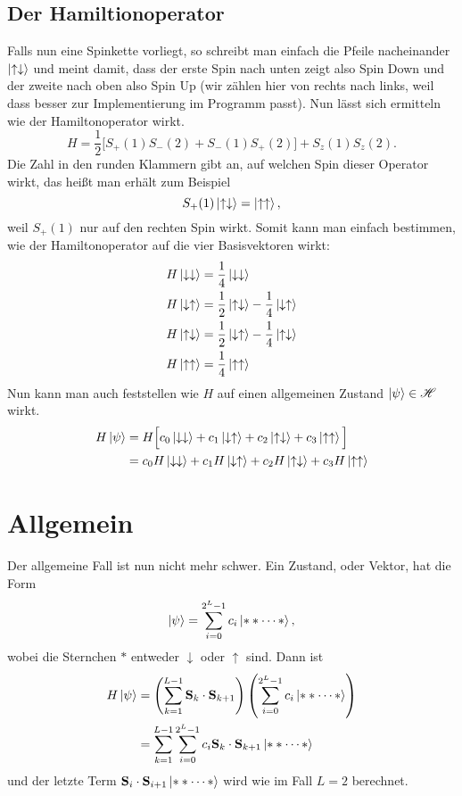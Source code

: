 \documentclass[11pt,a4paper]{scrartcl}
\begin{document}
\subsection{Der Hamiltionoperator}
Falls nun eine Spinkette vorliegt, so schreibt man einfach die Pfeile nacheinander $\ket{\uparrow\downarrow}$ und meint damit, dass der erste Spin nach unten zeigt also Spin Down und der zweite nach oben also Spin Up (wir zählen hier von rechts nach links, weil dass besser zur Implementierung im Programm passt). Nun lässt sich ermitteln wie der Hamiltonoperator wirkt.
\begin{equation*}
	H=\frac{1}{2}\Big[S_+(1)S_-(2)+S_-(1)S_+(2)\Big]+S_z(1)S_z(2).
\end{equation*}
Die Zahl in den runden Klammern gibt an, auf welchen Spin dieser Operator wirkt, das heißt man erhält zum Beispiel
\begin{equation*}
	S_+(1)\ket{\uparrow\downarrow}=\ket{\uparrow\uparrow},
\end{equation*}
weil $S_+(1)$ nur auf den rechten Spin wirkt. Somit kann man einfach bestimmen, wie der Hamiltonoperator auf die vier Basisvektoren wirkt:
\begin{align*}
	H\ket{\downarrow\downarrow}&=\frac{1}{4}\ket{\downarrow\downarrow}\\
	H\ket{\downarrow\uparrow}
	&=\frac{1}{2}\ket{\uparrow\downarrow}-\frac{1}{4}\ket{\downarrow\uparrow}\\
	H\ket{\uparrow\downarrow}
	&=\frac{1}{2}\ket{\downarrow\uparrow}-\frac{1}{4}\ket{\uparrow\downarrow}\\
	H\ket{\uparrow\uparrow}&=\frac{1}{4}\ket{\uparrow\uparrow}
\end{align*}
Nun kann man auch feststellen wie $H$ auf einen allgemeinen Zustand $\ket{\psi}\in\mathscr{H}$ wirkt.
\begin{align*}
	H\ket{\psi}
	&=H\Big[c_0\ket{\downarrow\downarrow}+c_1\ket{\downarrow\uparrow}
	+c_2\ket{\uparrow\downarrow}+c_3\ket{\uparrow\uparrow}\Big]\\
	&=c_0H\ket{\downarrow\downarrow}+c_1H\ket{\downarrow\uparrow}
	+c_2H\ket{\uparrow\downarrow}+c_3H\ket{\uparrow\uparrow}
\end{align*}
\section{Allgemein}
Der allgemeine Fall ist nun nicht mehr schwer. Ein Zustand, oder Vektor, hat die Form
\begin{equation*}
	\ket{\psi}=\sum_{i=0}^{2^L-1}c_i\ket{**\dots*},
\end{equation*}
wobei die Sternchen $*$ entweder $\downarrow$ oder $\uparrow$ sind. Dann ist
\begin{align*}
	H\ket{\psi}&=
	\left(\sum_{k=1}^{L-1}\vb{S}_k\cdot\vb{S}_{k+1}\right)
	\left(\sum_{i=0}^{2^L-1}c_i\ket{**\dots*}\right)\\
	&=\sum_{k=1}^{L-1}\sum_{i=0}^{2^L-1}c_i\vb{S}_k\cdot\vb{S}_{k+1}\ket{**\dots*}
\end{align*}
und der letzte Term $\vb{S}_i\cdot\vb{S}_{i+1}\ket{**\dots*}$ wird wie im Fall $L=2$ berechnet.
\end{document}
